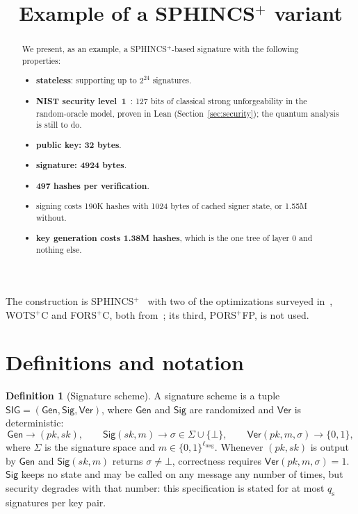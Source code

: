 \documentclass[11pt]{article}
\title{Example of a SPHINCS$^+$ variant}
\author{}
\date{}
\theoremstyle{definition}
\newtheorem{definition}{Definition}[section]
\theoremstyle{plain}
\theoremstyle{remark}
\newcommand{\bits}[1]{\{0,1\}^{#1}}
\newcommand{\Gen}{\mathsf{Gen}}
\newcommand{\Sig}{\mathsf{Sig}}
\newcommand{\Ver}{\mathsf{Ver}}
\newcommand{\SIG}{\mathsf{SIG}}
\newcommand{\sk}{\mathit{sk}}
\newcommand{\pk}{\mathit{pk}}
\newcommand{\lmsg}{\ell_{\mathrm{msg}}}
\newcommand{\qs}{q_{\mathrm{s}}}
\begin{document}
\maketitle

\begin{abstract}

We present, as an example, a SPHINCS$^+$-based signature with the following properties:

\begin{itemize}
  \item \textbf{stateless}: supporting up to $2^{24}$ signatures.
  \item \textbf{NIST security level~1}~\cite{NISTPQC}: 127 bits of classical strong unforgeability in the random-oracle model, proven in Lean (Section~\ref{sec:security}); the quantum analysis is still to do.
  \item \textbf{public key: 32 bytes}.
  \item \textbf{signature: 4924 bytes}.
  \item \textbf{497 hashes per verification}.
  \item signing costs 190K hashes with 1024 bytes of cached signer state, or 1.55M without.
  \item \textbf{key generation costs 1.38M hashes}, which is the one tree of layer $0$ and nothing else.
\end{itemize}
\end{abstract}

The construction is SPHINCS$^+$~\cite{SPHINCSPLUS,FIPS205} with two of the optimizations surveyed in~\cite{KN25}, WOTS$^+$C and FORS$^+$C, both from~\cite{HK22C}; its third, PORS$^+$FP, is not used.

\section{Definitions and notation}

\begin{definition}[Signature scheme]
A signature scheme is a tuple $\SIG=(\Gen,\Sig,\Ver)$, where $\Gen$ and $\Sig$ are randomized and $\Ver$ is deterministic:
\[
  \Gen\longrightarrow(\pk,\sk),\qquad
  \Sig(\sk,m)\longrightarrow\sigma\in\Sigma\cup\{\bot\},\qquad
  \Ver(\pk,m,\sigma)\longrightarrow\{0,1\},
\]
where $\Sigma$ is the signature space and $m\in\bits{\lmsg}$. Whenever $(\pk,\sk)$ is output by $\Gen$ and $\Sig(\sk,m)$ returns $\sigma\neq\bot$, correctness requires $\Ver(\pk,m,\sigma)=1$. $\Sig$ keeps no state and may be called on any message any number of times, but security degrades with that number: this specification is stated for at most $\qs$ signatures per key pair.
\end{definition}
\end{document}

